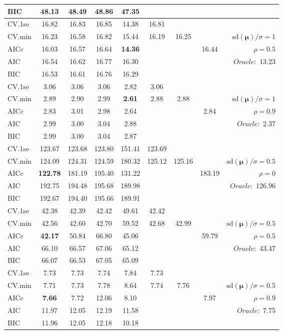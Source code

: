 \begin{table}
\begin{center}
\begin{tabular}{l*{7}{c}|r}
BIC & 48.13 & 48.49 & 48.86 & 47.35 & & & &  \\
 \hline 
CV.1se & 16.82 & 16.83 & 16.85 & 14.38 & 16.81 & & & \\
CV.min & 16.23 & 16.58 & 16.82 & 15.44 & 16.19 & 16.25 & & $\mathrm{sd}(\mathbf{\mu})/\sigma=1$ \\
AICc & 16.03 & 16.57 & 16.64 & {\bf 14.36} & & & 16.44 &  $\rho=0.5$ \\
AIC & 16.54 & 16.62 & 16.77 & 16.30 & & & &  \multirow{2}{*}{$Oracle: $ 13.23} \\
BIC & 16.53 & 16.61 & 16.76 & 16.29 & & & &  \\
 \hline 
CV.1se & 3.06 & 3.06 & 3.06 & 2.82 & 3.06 & & & \\
CV.min & 2.89 & 2.90 & 2.99 & {\bf 2.61} & 2.88 & 2.88 & & $\mathrm{sd}(\mathbf{\mu})/\sigma=1$ \\
AICc & 2.83 & 3.01 & 2.98 & 2.64 & & & 2.84 &  $\rho=0.9$ \\
AIC & 2.99 & 3.00 & 3.04 & 2.88 & & & &  \multirow{2}{*}{$Oracle: $ 2.37} \\
BIC & 2.99 & 3.00 & 3.04 & 2.87 & & & &  \\
 \hline 
CV.1se & 123.67 & 123.68 & 123.80 & 151.41 & 123.69 & & & \\
CV.min & 124.09 & 124.31 & 124.59 & 180.32 & 125.12 & 125.16 & & $\mathrm{sd}(\mathbf{\mu})/\sigma=0.5$ \\
AICc & {\bf 122.78} & 181.19 & 195.40 & 131.22 & & & 183.19 &  $\rho=0$ \\
AIC & 192.75 & 194.48 & 195.68 & 189.98 & & & &  \multirow{2}{*}{$Oracle: $ 126.96} \\
BIC & 192.67 & 194.40 & 195.66 & 189.91 & & & &  \\
 \hline 
CV.1se & 42.38 & 42.39 & 42.42 & 49.61 & 42.42 & & & \\
CV.min & 42.56 & 42.60 & 42.70 & 59.52 & 42.68 & 42.99 & & $\mathrm{sd}(\mathbf{\mu})/\sigma=0.5$ \\
AICc & {\bf 42.17} & 50.84 & 66.80 & 45.06 & & & 59.79 &  $\rho=0.5$ \\
AIC & 66.10 & 66.57 & 67.06 & 65.12 & & & &  \multirow{2}{*}{$Oracle: $ 43.47} \\
BIC & 66.07 & 66.53 & 67.05 & 65.09 & & & &  \\
 \hline 
CV.1se & 7.73 & 7.73 & 7.74 & 7.84 & 7.73 & & & \\
CV.min & 7.71 & 7.73 & 7.78 & 8.64 & 7.74 & 7.76 & & $\mathrm{sd}(\mathbf{\mu})/\sigma=0.5$ \\
AICc & {\bf 7.66} & 7.72 & 12.06 & 8.10 & & & 7.97 &  $\rho=0.9$ \\
AIC & 11.97 & 12.05 & 12.19 & 11.58 & & & &  \multirow{2}{*}{$Oracle: $ 7.75} \\
BIC & 11.96 & 12.05 & 12.18 & 10.18 & & & &  \\
 \hline 
\end{tabular}
\end{center}
\vspace{-1cm}
\end{table}





